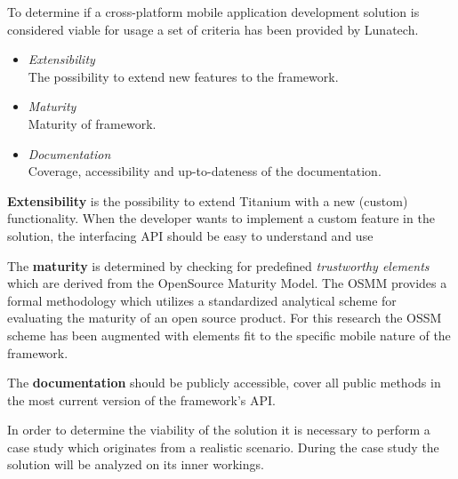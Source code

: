 

To determine if a cross-platform mobile application development solution is considered viable for usage a set of criteria has been provided by Lunatech.
\begin{itemize}
	\item \emph{Extensibility}\\
	The possibility to extend new features to the framework.
	\item \emph{Maturity}\\ 
	Maturity of framework.
	\item \emph{Documentation}\\
	Coverage, accessibility and up-to-dateness of the documentation.
\end{itemize}


{\bf Extensibility} is the possibility to extend Titanium with a new (custom) functionality. 
When the developer wants to implement a custom feature in the solution, the interfacing API should be easy to understand and use

The {\bf maturity} is determined by checking for predefined \emph{trustworthy elements} which are derived from the OpenSource Maturity Model\cite{Wikipedia2011}. The OSMM provides a formal methodology which utilizes a standardized analytical scheme for evaluating the maturity of an open source product. For this research the OSSM scheme has been augmented with elements fit to the specific mobile nature of the framework.

The {\bf documentation} should be publicly accessible, cover all public methods in the most current version of the framework's API.

%
%

In order to determine the viability of the solution it is necessary to perform a case study which originates from a realistic scenario. During the case study the solution will be analyzed on its inner workings. 

